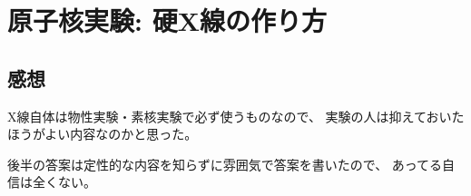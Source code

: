 \documentclass[../../sp_2014.tex]{subfiles}
\begin{document}
\section{原子核実験: 硬X線の作り方}



\subsection*{感想}
X線自体は物性実験・素核実験で必ず使うものなので、
実験の人は抑えておいたほうがよい内容なのかと思った。

後半の答案は定性的な内容を知らずに雰囲気で答案を書いたので、
あってる自信は全くない。
\end{document}
